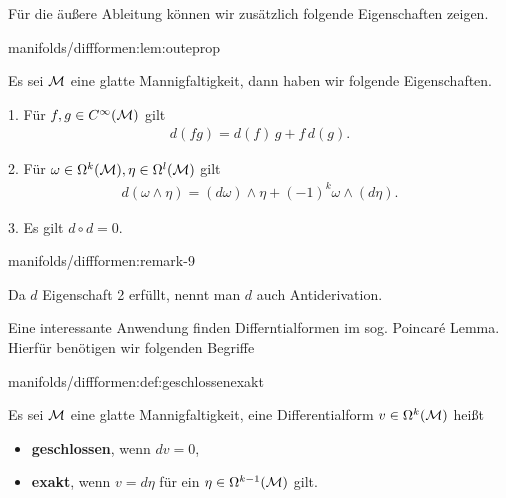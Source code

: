 \par
Für die äußere Ableitung können wir zusätzlich folgende Eigenschaften zeigen.
\begin{lemma}{}{manifolds/diffformen:lem:outeprop}



\par
Es sei \(\mathcal{M}\) eine glatte Mannigfaltigkeit, dann haben wir folgende Eigenschaften.



\par
1. Für \(f,g\in C^\infty(\mathcal{M})\) gilt
\begin{align*}
d(fg) = d(f)\,g + f\, d(g).
\end{align*}


\par
2. Für \(\omega\in\Omega^k(\mathcal{M}),\eta\in\Omega^l(\mathcal{M})\) gilt
\begin{align*}
d(\omega\wedge\eta) = (d\omega)\wedge \eta + (-1)^k \omega\wedge (d\eta).
\end{align*}


\par
3. Es gilt \(d\circ d = 0\).
\end{lemma}
\begin{remark}{}{manifolds/diffformen:remark-9}



\par
Da \(d\) Eigenschaft 2 erfüllt, nennt man \(d\) auch Antiderivation.
\end{remark}

\par
Eine interessante Anwendung finden Differntialformen im sog. Poincaré Lemma. Hierfür benötigen wir folgenden Begriffe
\begin{definition}{}{manifolds/diffformen:def:geschlossenexakt}



\par
Es sei \(\mathcal{M}\) eine glatte Mannigfaltigkeit, eine Differentialform \(v\in\Omega^k(\mathcal{M})\) heißt
\begin{itemize}
\item {} 
\par
\textbf{geschlossen}, wenn \(dv=0\),

\item {} 
\par
\textbf{exakt}, wenn \(v=d\eta\) für ein \(\eta\in\Omega^{k-1}(\mathcal{M})\) gilt.

\end{itemize}
\end{definition}

